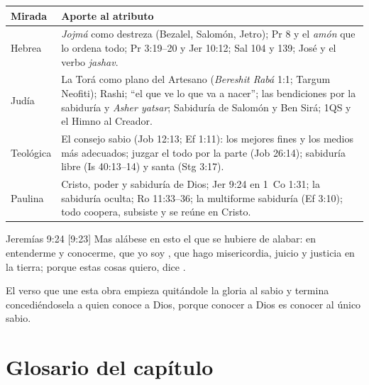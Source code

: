 \begin{center}\small\renewcommand{\arraystretch}{1.3}
\begin{tabular}{@{}L{3.0cm}L{11.4cm}@{}}
\toprule
\textbf{Mirada} & \textbf{Aporte al atributo} \\ \midrule
Hebrea & \emph{Jojmá} como destreza (Bezalel, Salomón, Jetro); Pr 8 y el \emph{amón} que lo ordena todo; Pr 3:19--20 y Jer 10:12; Sal 104 y 139; José y el verbo \emph{jashav}. \\
Judía & La Torá como plano del Artesano (\emph{Bereshit Rabá} 1:1; Targum Neofiti); Rashi; ``el que ve lo que va a nacer''; las bendiciones por la sabiduría y \emph{Asher yatsar}; Sabiduría de Salomón y Ben Sirá; 1QS y el Himno al Creador. \\
Teológica & El consejo sabio (Job 12:13; Ef 1:11): los mejores fines y los medios más adecuados; juzgar el todo por la parte (Job 26:14); sabiduría libre (Is 40:13--14) y santa (Stg 3:17). \\
Paulina & Cristo, poder y sabiduría de Dios; Jer 9:24 en 1~Co 1:31; la sabiduría oculta; Ro 11:33--36; la multiforme sabiduría (Ef 3:10); todo coopera, subsiste y se reúne en Cristo. \\
\bottomrule
\end{tabular}\end{center}

\begin{verso}{Jeremías 9:24 [9:23]}
Mas alábese en esto el que se hubiere de alabar: en entenderme y conocerme, que yo soy \SENOR, que hago misericordia, juicio y justicia en la tierra; porque estas cosas quiero, dice \SENOR.
\end{verso}

El verso que une esta obra empieza quitándole la gloria al sabio y termina concediéndosela a quien conoce a Dios, porque conocer a Dios es conocer al único sabio.

\section*{Glosario del capítulo}

